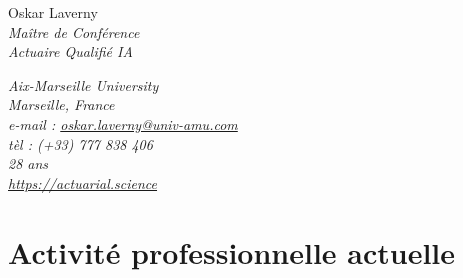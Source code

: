 \documentclass[a4paper,11pt]{article} %
\newcommand*{\namefont}{\fontsize{28}{30}\mdseries\upshape}
\newcommand*{\titlefont}{\LARGE\mdseries\slshape}
\newcommand*{\addressfont}{\small\mdseries\slshape}
\newcommand*{\namestyle}[1]{{\namefont\textcolor{color0}{#1}}}
\newcommand*{\titlestyle}[1]{{\titlefont\textcolor{color2}{#1}}}
\newcommand*{\addressstyle}[1]{{\addressfont\textcolor{color2}{#1}}}
\begin{document}
\begin{multicols}{2}\raggedright
\namestyle{Oskar Laverny} \\
\vspace{0.5cm}
\titlestyle{Maître de Conférence}\\
\vspace{0.2cm}
\titlestyle{Actuaire Qualifié IA}
\columnbreak

\raggedleft
\addressstyle{
Aix-Marseille University\\
Marseille, France\\
e-mail : \url{oskar.laverny@univ-amu.com}\\
tèl : (+33) 777 838 406\\
28 ans\\
\url{https://actuarial.science}
}
\end{multicols}
\vspace{0.2cm}
\section{Activité professionnelle actuelle}\label{subsec:act_pro_actuelle}
\end{document}
